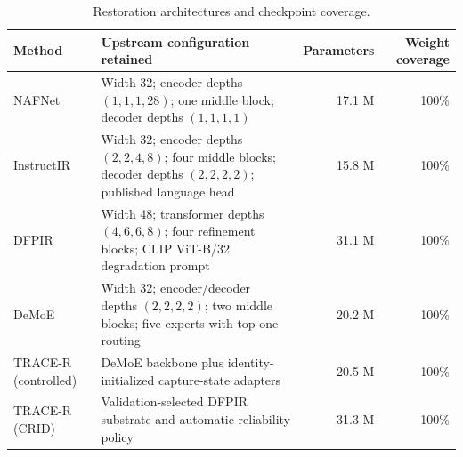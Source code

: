 \begin{table}[!t]
\centering
\caption{Restoration architectures and checkpoint coverage.}
\label{tab:architecture_audit}
\scriptsize
\setlength{\tabcolsep}{3pt}
\begin{tabular}{lp{}rr}
\toprule
Method & Upstream configuration retained & Parameters & Weight coverage \\
\midrule
NAFNet & Width 32; encoder depths $(1,1,1,28)$; one middle block; decoder depths $(1,1,1,1)$ & 17.1 M & 100\% \\
InstructIR & Width 32; encoder depths $(2,2,4,8)$; four middle blocks; decoder depths $(2,2,2,2)$; published language head & 15.8 M & 100\% \\
DFPIR & Width 48; transformer depths $(4,6,6,8)$; four refinement blocks; CLIP ViT-B/32 degradation prompt & 31.1 M & 100\% \\
DeMoE & Width 32; encoder/decoder depths $(2,2,2,2)$; two middle blocks; five experts with top-one routing & 20.2 M & 100\% \\
TRACE-R (controlled) & DeMoE backbone plus identity-initialized capture-state adapters & 20.5 M & 100\% \\
TRACE-R (CRID) & Validation-selected DFPIR substrate and automatic reliability policy & 31.3 M & 100\% \\
\bottomrule
\end{tabular}
\end{table}
